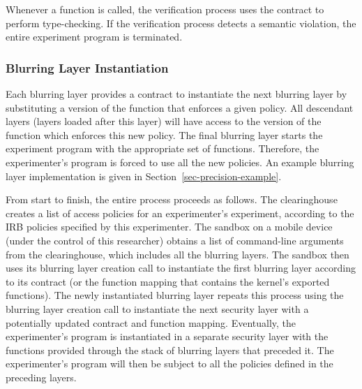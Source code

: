 Whenever a function is called, the verification process uses the 
contract to perform type-checking. If the verification process 
detects a semantic violation, the entire experiment program is 
terminated. 

\subsubsection{Blurring Layer Instantiation}

Each blurring layer provides a contract to instantiate the 
next blurring layer by substituting a version of the function that 
enforces a given policy. All descendant layers (layers loaded 
after this layer) will have access to the version of the function 
which enforces this new policy. The final blurring layer starts the 
experiment program with the appropriate set of functions. 
Therefore, the experimenter's program is forced to use all the 
new policies. An example blurring layer implementation is given in 
Section~\ref{sec-precision-example}.  

From start to finish, the entire process proceeds as follows. 
The clearinghouse creates a list of access policies for an experimenter's
experiment, according to the IRB policies specified by this 
experimenter. The sandbox on a mobile device (under the control of
this researcher) obtains a list of command-line arguments 
from the clearinghouse, which includes all the blurring layers.
The sandbox then uses its blurring layer creation call to instantiate 
the first blurring layer according to its contract (or the function 
mapping that contains the kernel's exported functions).
The newly instantiated blurring layer repeats this process using the 
blurring layer creation call to instantiate the next
security layer with a potentially updated contract and function
mapping. Eventually, the experimenter's program is instantiated
in a separate security layer with the functions provided
through the stack of blurring layers that preceded it.
The experimenter's program will then be subject to all the 
policies defined in the preceding layers.

